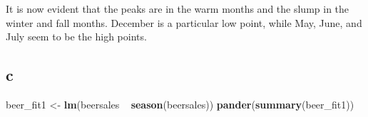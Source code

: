 \documentclass[]{book}
\newenvironment{Shaded}{\begin{snugshade}}{\end{snugshade}}
\newcommand{\KeywordTok}[1]{\textcolor[rgb]{0.13,0.29,0.53}{\textbf{{#1}}}}
\newcommand{\StringTok}[1]{\textcolor[rgb]{0.31,0.60,0.02}{{#1}}}
\newcommand{\NormalTok}[1]{{#1}}
\theoremstyle{definition}
\theoremstyle{definition}
\theoremstyle{remark}
\begin{document}
It is now evident that the peaks are in the warm months and the slump in
the winter and fall months. December is a particular low point, while
May, June, and July seem to be the high points.

\subsection*{c}\label{c-12}

\begin{Shaded}
\begin{Highlighting}[]
\NormalTok{beer_fit1 <-}\StringTok{ }\KeywordTok{lm}\NormalTok{(beersales ~}\StringTok{ }\KeywordTok{season}\NormalTok{(beersales))}
\KeywordTok{pander}\NormalTok{(}\KeywordTok{summary}\NormalTok{(beer_fit1))}
\end{Highlighting}
\end{Shaded}
\end{document}
